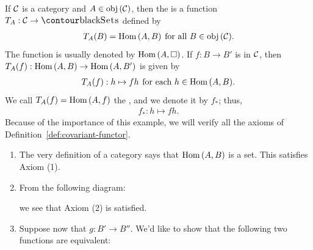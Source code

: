     \begin{example}\label{ex:covariant-induced-maps}
        If $\mathcal{C}$ is a category and $A \in \operatorname{obj}{(\mathcal{C})}$, then the \newline {} is a function $T_A:\mC \rightarrow \cSets$ defined by
            \begin{equation*}
            \begin{split}
                T_A(B) = \operatorname{Hom}{(A,B)} \hspace{4pt} \text{for all $B \in \operatorname{obj}{(\mathcal{C})}$}.
            \end{split}
            \end{equation*}
        The function is usually denoted by $\operatorname{Hom}{(A,\square)}$. If $f:B \rightarrow B'$ is in $\mathcal{C}$, then $T_A(f):\operatorname{Hom}{(A,B)} \rightarrow \operatorname{Hom}{(A,B')}$ is given by
            \begin{equation*}
            \begin{split}
                T_A(f): h \mapsto fh \hspace{4pt} \text{for each $h \in \operatorname{Hom}{(A,B)}$}.
            \end{split}
            \end{equation*}
        We call $T_A(f) = \operatorname{Hom}{(A,f)}$ the , and we denote it by $f_\ast$; thus,
            \begin{equation*}
            \begin{split}
                f_\ast : h \mapsto fh.
            \end{split}
            \end{equation*}
        Because of the importance of this example, we will verify all the axioms of Definition~\ref{def:covariant-functor}.
            \begin{enumerate}[label = (\roman*)]
                \item The very definition of a category says that $\operatorname{Hom}{(A,B)}$ is a set. This satisfies Axiom (1).
                \item From the following diagram:
                    \begin{center}
                    \end{center}
                   we see that Axiom (2) is satisfied.
                \item Suppose now that $g:B' \rightarrow B''$. We'd like to show that the following two functions are equivalent:

\end{enumerate}
\end{example}
